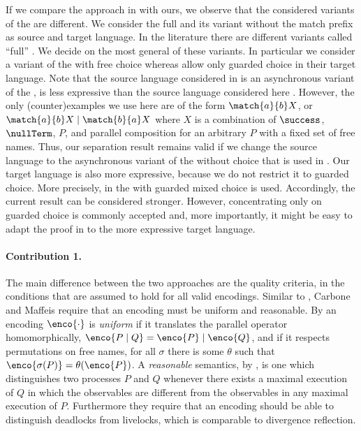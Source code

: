 \documentclass[]{article}
\begin{document}
If we compare the approach in \cite{carbone} with ours, we observe that the considered variants of the \piCal are different.
We consider the full \piCal and its variant without the match prefix as source and target language.
In the literature there are different variants called ``full'' \piCal. We decide on the most general of these variants. In particular we consider a variant of the \piCal with free choice whereas \cite{carbone} allow only guarded choice in their target language.
Note that the source language considered in \cite{carbone} is an asynchronous variant of the \piCal, \ie is less expressive than the source language considered here \cite{palamidessi03,petersNestmann14,petersNestmannGoltz13}.
However, the only (counter)examples we use here are of the form $ \match{a}{b}X $, or $\match{a}{b}X \mid \match{b}{a}X$ where $ X $ is a combination of $ \success $, $ \nullTerm $, $ P $, and parallel composition for an arbitrary $ P $ with a fixed set of free names. Thus, our separation result remains valid if we change the source language to the asynchronous variant of the \piCal without choice that is used in \cite{carbone}.
Our target language is also more expressive, because we do not restrict it to guarded choice. More precisely, in \cite{carbone} the \piCal with guarded mixed choice is used. Accordingly, the current result can be considered stronger. However, concentrating only on guarded choice is commonly accepted and, more importantly, it might be easy to adapt the proof in \cite{carbone} to the more expressive target language.

\paragraph{Contribution 1.}
The main difference between the two approaches are the quality criteria, \ie in the conditions that are assumed to hold for all valid encodings.
Similar to \cite{palamidessi03}, Carbone and Maffeis require that an encoding must be uniform and reasonable.
By \cite{carbone} an encoding $\enco{\cdot}$ is \emph{uniform} if it translates the parallel operator homomorphically, \ie $ \enco{P \mid Q} = \enco{P}\mid \enco{Q} $, and if it respects permutations on free names, \ie for all $ \sigma $ there is some $ \theta $ such that $ \enco{\sigma(P)} = \theta(\enco{P}) $.
A \emph{reasonable} semantics, by \cite{carbone}, is one which distinguishes two processes $ P $ and $ Q $ whenever there exists a maximal execution of $ Q $ in which the observables are different from the observables in any maximal execution of $ P $.
Furthermore they require that an encoding should be able to distinguish deadlocks from livelocks, which is comparable to divergence reflection.
\end{document}
